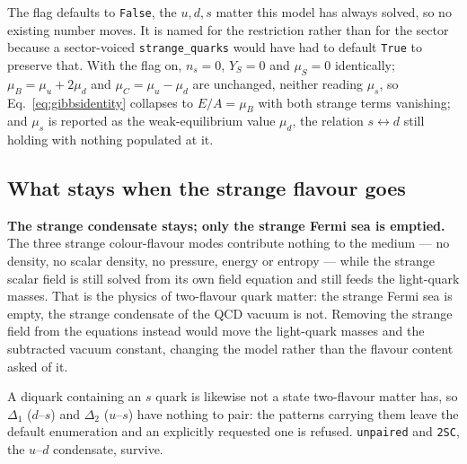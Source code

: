 \documentclass[11pt,a4paper]{article}
\begin{document}
The flag defaults to \texttt{False}, the $u,d,s$ matter this model has always
solved, so no existing number moves. It is named for the restriction rather
than for the sector because a sector-voiced \texttt{strange\_quarks} would have
had to default \texttt{True} to preserve that. With the flag on, $n_s = 0$,
$Y_S = 0$ and $\mu_S = 0$ identically; $\mu_B = \mu_u + 2\mu_d$ and
$\mu_C = \mu_u - \mu_d$ are unchanged, neither reading $\mu_s$, so
Eq.~\eqref{eq:gibbsidentity} collapses to $E/A = \mu_B$ with both strange terms
vanishing; and $\mu_s$ is reported as the weak-equilibrium value $\mu_d$, the
relation $s \leftrightarrow d$ still holding with nothing populated at it.

\subsection{What stays when the strange flavour goes}

\textbf{The strange condensate stays; only the strange Fermi sea is emptied.}
The three strange colour-flavour modes contribute nothing to the medium --- no
density, no scalar density, no pressure, energy or entropy --- while the
strange scalar field is still solved from its own field equation and still
feeds the light-quark masses. That is the physics of two-flavour quark matter:
the strange Fermi sea is empty, the strange condensate of the QCD vacuum is
not. Removing the strange field from the equations instead would move the
light-quark masses and the subtracted vacuum constant, changing the model
rather than the flavour content asked of it.

A diquark containing an $s$ quark is likewise not a state two-flavour matter
has, so $\Delta_1$ ($d$--$s$) and $\Delta_2$ ($u$--$s$) have nothing to pair:
the patterns carrying them leave the default enumeration and an explicitly
requested one is refused. \texttt{unpaired} and \texttt{2SC}, the $u$--$d$
condensate, survive.




\end{document}
